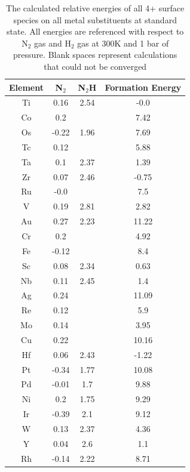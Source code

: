 \begin{table}
\begin{center}
\begin{tabular}{| c | c | c | c |}
\hline
Element & N$_2$ & N$_2$H & Formation Energy \\
\hline
Ti & 0.16 & 2.54 & -0.0 \\
Co & 0.2 &  & 7.42 \\
Os & -0.22 & 1.96 & 7.69 \\
Tc & 0.12 &  & 5.88 \\
Ta & 0.1 & 2.37 & 1.39 \\
Zr & 0.07 & 2.46 & -0.75 \\
Ru & -0.0 &  & 7.5 \\
V & 0.19 & 2.81 & 2.82 \\
Au & 0.27 & 2.23 & 11.22 \\
Cr & 0.2 &  & 4.92 \\
Fe & -0.12 &  & 8.4 \\
Sc & 0.08 & 2.34 & 0.63 \\
Nb & 0.11 & 2.45 & 1.4 \\
Ag & 0.24 &  & 11.09 \\
Re & 0.12 &  & 5.9 \\
Mo & 0.14 &  & 3.95 \\
Cu & 0.22 &  & 10.16 \\
Hf & 0.06 & 2.43 & -1.22 \\
Pt & -0.34 & 1.77 & 10.08 \\
Pd & -0.01 & 1.7 & 9.88 \\
Ni & 0.2 & 1.75 & 9.29 \\
Ir & -0.39 & 2.1 & 9.12 \\
W & 0.13 & 2.37 & 4.36 \\
Y & 0.04 & 2.6 & 1.1 \\
Rh & -0.14 & 2.22 & 8.71 \\
\hline
\end{tabular}
\end{center}
\caption{The calculated relative energies of all 4+ surface species on all metal substituents at standard state. All energies are referenced with respect to N$_2$ gas and H$_2$ gas at 300K and 1 bar of pressure. Blank spaces represent calculations that could not be converged}
\hline
\end{table}

